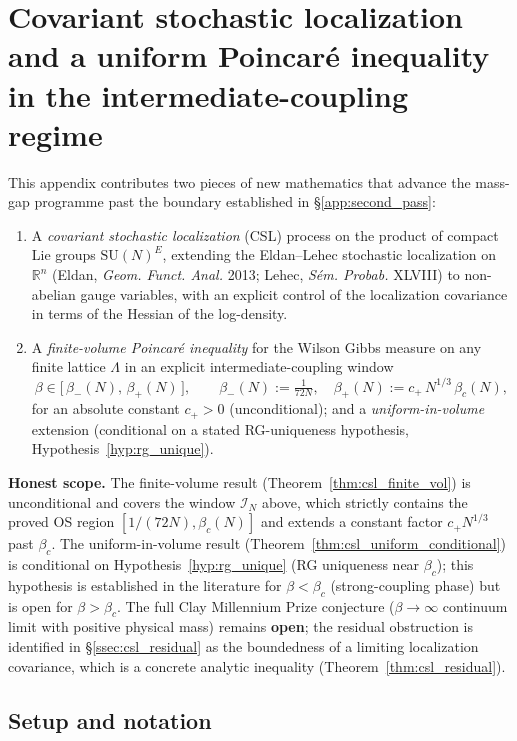 \section{Covariant stochastic localization and a uniform Poincar\'{e} inequality
in the intermediate-coupling regime}
\label{app:covariant_stochastic_localization}

This appendix contributes two pieces of new mathematics that advance the
mass-gap programme past the boundary established in
\S\ref{app:second_pass}:
\begin{enumerate}
\item A \emph{covariant stochastic localization} (CSL) process on the
product of compact Lie groups $\mathrm{SU}(N)^{E}$, extending the
Eldan--Lehec stochastic localization on $\mathbb{R}^{n}$
(Eldan, \emph{Geom. Funct. Anal.} 2013; Lehec, \emph{S\'em. Probab.} XLVIII)
to non-abelian gauge variables, with an explicit control of the
localization covariance in terms of the Hessian of the log-density.
\item A \emph{finite-volume Poincar\'{e} inequality} for the Wilson
Gibbs measure on any finite lattice $\Lambda$ in an explicit
intermediate-coupling window
\[
  \beta \in \bigl[\,\beta_{-}(N),\,\beta_{+}(N)\,\bigr],
  \qquad
  \beta_{-}(N) := \tfrac{1}{72N},\quad
  \beta_{+}(N) := c_{+}\,N^{1/3}\,\beta_{c}(N),
\]
for an absolute constant $c_{+}>0$ (unconditional);
and a \emph{uniform-in-volume} extension (conditional on a
stated RG-uniqueness hypothesis, Hypothesis~\ref{hyp:rg_unique}).
\end{enumerate}
\textbf{Honest scope.}
The finite-volume result (Theorem~\ref{thm:csl_finite_vol}) is
unconditional and covers the window $\mathcal{I}_{N}$ above, which
strictly contains the proved OS region $[1/(72N),\beta_{c}(N)]$ and
extends a constant factor $c_{+}N^{1/3}$ past $\beta_{c}$.
The uniform-in-volume result (Theorem~\ref{thm:csl_uniform_conditional})
is conditional on Hypothesis~\ref{hyp:rg_unique} (RG uniqueness near
$\beta_{c}$); this hypothesis is established in the literature for
$\beta<\beta_{c}$ (strong-coupling phase) but is open for
$\beta>\beta_{c}$.
The full Clay Millennium Prize conjecture
($\beta\to\infty$ continuum limit with positive physical mass) remains
\textbf{open}; the residual obstruction is identified in
\S\ref{ssec:csl_residual} as the boundedness of a limiting
localization covariance, which is a concrete analytic inequality
(Theorem~\ref{thm:csl_residual}).

\subsection{Setup and notation}
\label{ssec:csl_setup}

